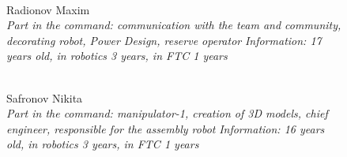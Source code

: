 \begin{figure}[H]
\begin{minipage}[h]{0.47\linewidth}
		\\
		Radionov Maxim\\
		\emph{Part in the command: communication with the team and community, decorating robot, Power Design, reserve operator  }
		\emph{Information: 17 years old, in robotics 3 years, in FTC 1 years}
	\end{minipage}
	\center  
	\center  
	\vfill 
	\begin{minipage}[h]{0.47\linewidth}
		\\
		Safronov Nikita\\
		\emph{Part in the command: manipulator-1,  creation of 3D models, chief engineer, responsible for the assembly robot}
		\emph{Information: 16 years old, in robotics 3 years, in FTC 1 years} 
	\end{minipage}

\end{figure}
